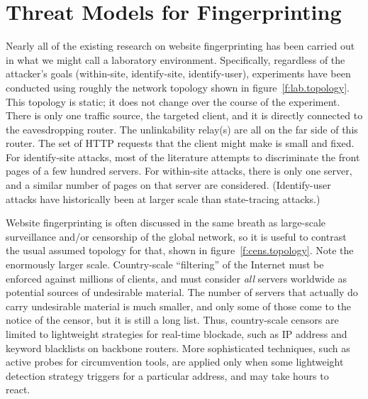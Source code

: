 

\section{Threat Models for Fingerprinting}

Nearly all of the existing research on website fingerprinting has been
carried out in what we might call a laboratory environment.
Specifically, regardless of the attacker's goals (within-site,
identify-site, identify-user), experiments have been conducted using
roughly the network topology shown in figure~\ref{f:lab.topology}.
This topology is static; it does not change over the course of the
experiment.  There is only one traffic source, the targeted client,
and it is directly connected to the eavesdropping router.  The
unlinkability relay(s) are all on the far side of this router.  The
set of HTTP requests that the client might make is small and fixed.
For identify-site attacks, most of the literature attempts to
discriminate the front pages of a few hundred servers.  For
within-site attacks, there is only one server, and a similar number of
pages on that server are considered.  (Identify-user attacks have
historically been at larger scale than state-tracing attacks.)

Website fingerprinting is often discussed in the same breath as
large-scale surveillance and/or censorship of the global network, so
it is useful to contrast the usual assumed topology for that, shown in
figure~\ref{f:cens.topology}.  Note the enormously larger scale.
Country-scale “filtering” of the Internet must be enforced against
millions of clients, and must consider \emph{all} servers worldwide as
potential sources of undesirable material.  The number of servers that
actually do carry undesirable material is much smaller, and only some
of those come to the notice of the censor, but it is still a long
list.  Thus, country-scale censors are limited to lightweight
strategies for real-time blockade, such as IP address and keyword
blacklists on backbone routers.  More sophisticated techniques, such
as active probes for circumvention tools, are applied only when some
lightweight detection strategy triggers for a particular address, and
may take hours to react.~\cite{aase2012whiskey}~

